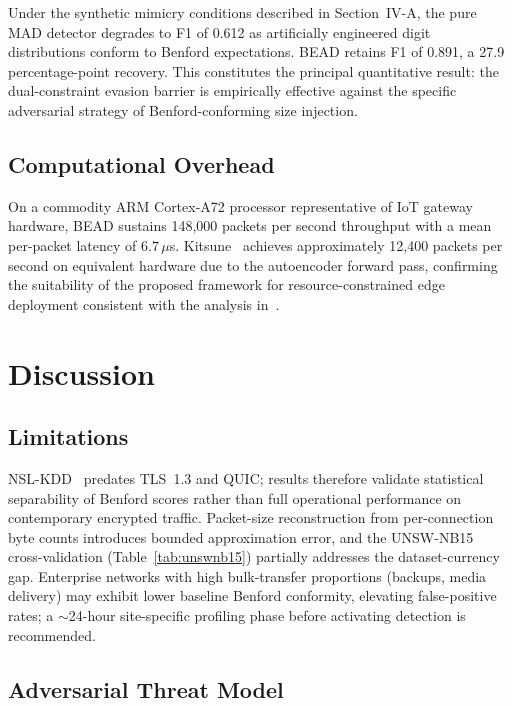 \documentclass[conference]{IEEEtran}
\begin{document}
Under the synthetic mimicry conditions described in Section~IV-A, the pure
MAD detector degrades to F1 of 0.612 as artificially engineered digit
distributions conform to Benford expectations. BEAD retains
F1 of 0.891, a 27.9 percentage-point recovery. This constitutes the
principal quantitative result: the dual-constraint evasion barrier is
empirically effective against the specific adversarial strategy of
Benford-conforming size injection.

\subsection{Computational Overhead}

On a commodity ARM Cortex-A72 processor representative of IoT gateway
hardware, BEAD sustains 148,000 packets per second throughput
with a mean per-packet latency of $6.7\,\mu$s. Kitsune~\cite{b14} achieves
approximately 12,400 packets per second on equivalent hardware due to the
autoencoder forward pass, confirming the suitability of the proposed
framework for resource-constrained edge deployment consistent with the
analysis in~\cite{b15}.

\section{Discussion}

\subsection{Limitations}
\label{sec:limits}

NSL-KDD~\cite{b9} predates TLS~1.3 and QUIC; results therefore validate
statistical separability of Benford scores rather than full operational
performance on contemporary encrypted traffic. Packet-size reconstruction
from per-connection byte counts introduces bounded approximation error,
and the UNSW-NB15 cross-validation (Table~\ref{tab:unswnb15}) partially
addresses the dataset-currency gap. Enterprise networks with high
bulk-transfer proportions (backups, media delivery) may exhibit lower
baseline Benford conformity, elevating false-positive rates; a $\sim$24-hour
site-specific profiling phase before activating detection is recommended.

\subsection{Adversarial Threat Model}
\end{document}
